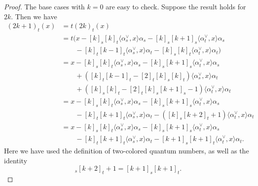 \documentclass{amsart}
\theoremstyle{plain}
\theoremstyle{definition}
\theoremstyle{remark}
\numberwithin{equation}{section}
\begin{document}
\begin{proof}
The base cases with $k=0$ are easy to check.
Suppose the result holds for $2k$. 
Then we have
\begin{align*}
(2k+1)_t(x)& =t(2k)_t(x) \\
& =t(x - [k]_s [k]_t \langle \alpha_s^\vee, x\rangle \alpha_s - [k]_s [k+1]_s \langle \alpha_t^\vee, x\rangle \alpha_s \\
& \quad \quad {} - [k]_t [k-1]_t \langle \alpha_s^\vee, x\rangle \alpha_t - [k]_s [k]_t \langle \alpha_t^\vee, x\rangle \alpha_t) \\
& =x - [k]_s [k]_t \langle \alpha_s^\vee, x\rangle \alpha_s - [k]_s [k+1]_s \langle \alpha_t^\vee, x\rangle \alpha_s \\
& \quad \quad {} + ([k]_t [k-1]_t - [2]_t [k]_s [k]_t)\langle \alpha_s^\vee, x\rangle \alpha_t \\
& \quad \quad {} + ([k]_s [k]_t - [2]_t [k]_s [k+1]_s - 1)\langle \alpha_t^\vee, x\rangle \alpha_t \\
& =x - [k]_s [k]_t \langle \alpha_s^\vee, x\rangle \alpha_s - [k]_s [k+1]_s \langle \alpha_t^\vee, x\rangle \alpha_s \\
& \quad \quad {} - [k]_t [k+1]_t \langle \alpha_s^\vee, x\rangle \alpha_t - ([k]_s [k+2]_t + 1)\langle \alpha_t^\vee, x\rangle \alpha_t \\
& =x - [k]_s [k]_t \langle \alpha_s^\vee, x\rangle \alpha_s - [k]_s [k+1]_s \langle \alpha_t^\vee, x\rangle \alpha_s \\
& \quad \quad {} - [k]_t [k+1]_t \langle \alpha_s^\vee, x\rangle \alpha_t - [k+1]_s [k+1]_t \langle \alpha_t^\vee, x\rangle \alpha_t \text{.}
\end{align*}
Here we have used the definition of two-colored quantum numbers, as well as the identity
\begin{equation}
[k]_s [k+2]_t + 1 = [k+1]_s [k+1]_t \text{.}
\end{equation}


\end{proof}
\end{document}

